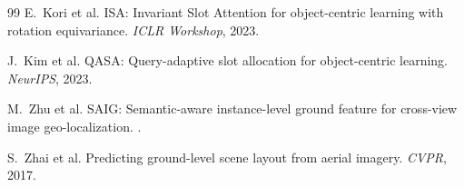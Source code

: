 \documentclass{article}
\begin{document}
{\begin{thebibliography}{99}
E.~Kori et al.
\newblock ISA: Invariant Slot Attention for object-centric learning with rotation equivariance.
\newblock \emph{ICLR Workshop}, 2023.

J.~Kim et al.
\newblock QASA: Query-adaptive slot allocation for object-centric learning.
\newblock \emph{NeurIPS}, 2023.

M.~Zhu et al.
\newblock SAIG: Semantic-aware instance-level ground feature for cross-view image geo-localization.
.

S.~Zhai et al.
\newblock Predicting ground-level scene layout from aerial imagery.
\newblock \emph{CVPR}, 2017.

\end{thebibliography}
}
\end{document}
